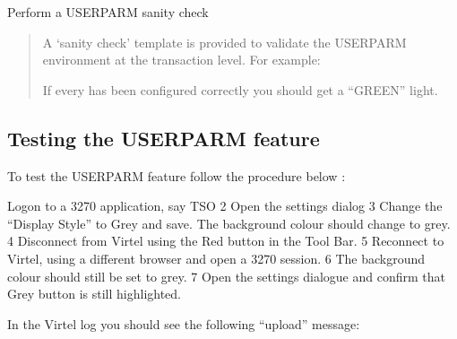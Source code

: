 \documentclass[letterpaper,10pt,english]{sphinxmanual}
\begin{document}
   Perform a USERPARM sanity check
\begin{quote}

\sphinxAtStartPar
A ‘sanity check’ template is provided to validate the USERPARM environment at the transaction level. For example:\sphinxhyphen{}

\begin{sphinxVerbatim}[commandchars=\\\{\}]
\end{sphinxVerbatim}

\sphinxAtStartPar
If every has been configured correctly you should get a “GREEN” light.
\end{quote}

\sphinxAtStartPar
{}

\sphinxAtStartPar
{}

\ignorespaces 

\subsection{Testing the USERPARM feature}
\label{\detokenize{Customization:testing-the-userparm-feature}}\label{\detokenize{Customization:index-96}}
\sphinxAtStartPar
To test the USERPARM feature follow the procedure below :\sphinxhyphen{}

   Logon to a 3270 application, say TSO
2   Open the settings dialog
3   Change the “Display Style” to Grey and save. The background colour should change to grey.
4   Disconnect from Virtel using the Red button in the Tool Bar.
5   Reconnect to Virtel, using a different browser and open a 3270 session.
6   The background colour should still be set to grey.
7   Open the settings dialogue and confirm that Grey button is still highlighted.

\sphinxAtStartPar
In the Virtel log you should see the following “upload” message:\sphinxhyphen{}

\begin{sphinxVerbatim}[commandchars=\\\{\}]
         
             
          
\end{sphinxVerbatim}
\end{document}
